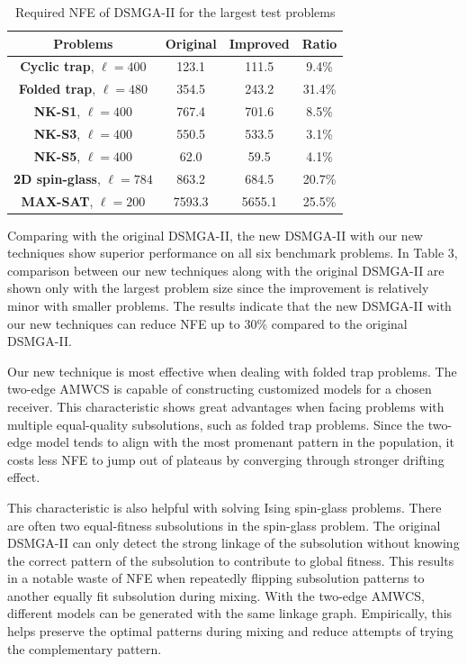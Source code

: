 \documentclass{sig-alternate-05-2015}
\begin{document}
\begin{table}[ht]
\centering
\begin{tabular}{ |c|c|c|c| } \hline
\textbf{Problems}& \textbf{Original} & \textbf{Improved} & \textbf{Ratio}\\ \hline
\textbf{Cyclic trap}, $\ell = 400$ 		& 123.1&111.5&9.4\%\\ \hline
\textbf{Folded trap}, $\ell = 480$	 	& 354.5& 243.2&31.4\%\\ \hline
\textbf{NK-S1}, $\ell = 400$ 				& 767.4& 701.6&8.5\%\\ \hline
\textbf{NK-S3}, $\ell = 400$ 				& 550.5& 533.5&3.1\%\\ \hline
\textbf{NK-S5}, $\ell = 400$ 				& 62.0& 59.5&4.1\%\\ \hline
\textbf{2D spin-glass}, $\ell = 784$ 	& 863.2&684.5&20.7\%\\ \hline
\textbf{MAX-SAT}, $\ell = 200$ 			& 7593.3& 5655.1&25.5\%\\ \hline
\end{tabular}
\caption{Required NFE of DSMGA-II for the largest test problems}
\end{table}

Comparing with the original DSMGA-II, the new DSMGA-II with our new techniques show superior performance on all six benchmark problems.
In Table 3, comparison between our new techniques along with the original DSMGA-II are shown only with the largest problem size since the improvement is relatively minor with smaller problems. 
The results indicate that the new DSMGA-II with our new techniques can reduce NFE up to 30\% compared to the original DSMGA-II. 


Our new technique is most effective when dealing with folded trap problems.
The two-edge AMWCS is capable of constructing customized models for a chosen receiver. 
This characteristic shows great advantages when facing problems with multiple equal-quality subsolutions, such as folded trap problems.
Since the two-edge model tends to align with the most promenant pattern in the population, it costs less NFE to jump out of plateaus by converging through stronger drifting effect.


This characteristic is also helpful with solving Ising spin-glass problems. 
There are often two equal-fitness subsolutions in the spin-glass problem.
The original DSMGA-II can only detect the strong linkage of the subsolution without knowing the correct pattern of the subsolution to contribute to global fitness.
This results in a notable waste of NFE when repeatedly flipping subsolution patterns to another equally fit subsolution during mixing.
With the two-edge AMWCS, different models can be generated with the same linkage graph. 
Empirically, this helps preserve the optimal patterns during mixing and reduce attempts of trying the complementary pattern.
\end{document}
